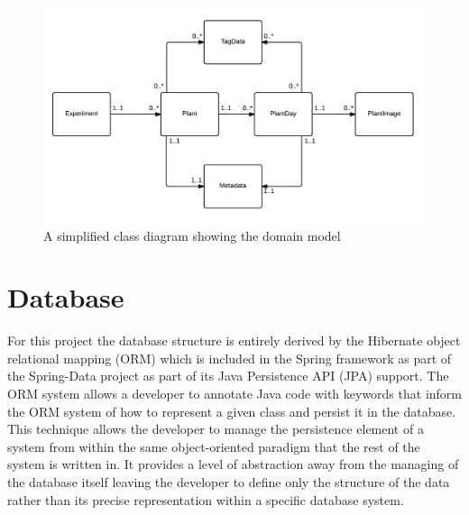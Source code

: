 \begin{figure}[H]
    \centering
    \includegraphics[width=\textwidth]{images/design/domain2}
    \caption{A simplified class diagram showing the domain model}
    \label{fig:domain2}
\end{figure} 

\section{Database} \label{db}

For this project the database structure is entirely derived by the Hibernate\cite{_hibernate} object relational mapping (ORM) which is included in the Spring framework as part of the Spring-Data project as part of its Java Persistence API (JPA) support. The ORM system allows a developer to annotate Java code with keywords that inform the ORM system of how to represent a given class and persist it in the database. This technique allows the developer to manage the persistence element of a system from within the same object-oriented paradigm that the rest of the system is written in. It provides a level of abstraction away from the managing of the database itself leaving the developer to define only the structure of the data rather than its precise representation within a specific database system.


